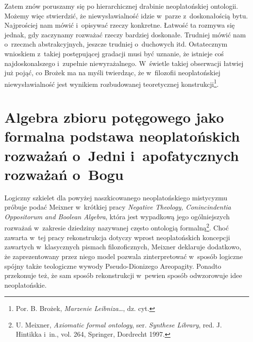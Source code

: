 Zatem znów poruszamy się po hierarchicznej drabinie neoplatońskiej ontologii. Możemy więc stwierdzić, że niewysławialność idzie w~parze z~doskonałością bytu. Najprościej nam mówić i~opisywać rzeczy konkretne. Łatwość ta rozmywa się jednak, gdy zaczynamy rozważać rzeczy bardziej doskonałe. Trudniej mówić nam o~rzeczach abstrakcyjnych, jeszcze trudniej o~duchowych itd. Ostatecznym wnioskiem z~takiej postępującej gradacji musi być uznanie, że istnieje coś najdoskonalszego i~zupełnie niewyrażalnego. W~świetle takiej obserwacji łatwiej już pojąć, co Brożek ma na myśli twierdząc, że w~filozofii neoplatońskiej niewysławialność jest wynikiem rozbudowanej teoretycznej konstrukcji\footnote{Por. B. Brożek, \textit{Marzenie Leibniza}\ldots, dz. cyt.}.

\section{Algebra zbioru potęgowego jako formalna podstawa neoplatońskich rozważań o~Jedni i~apofatycznych rozważań o~Bogu}

Logiczny szkielet dla powyżej naszkicowanego neoplatońskiego mistycyzmu próbuje podać Meixner w~krótkiej pracy \textit{Negative Theology, Conincindentia Oppositorum and Boolean Algebra}, która jest wypadkową jego ogólniejszych rozważań w~zakresie dziedziny nazywanej często ontologią formalną\footnote{U. Meixner, \textit{Axiomatic formal ontology}, ser. \textit{Synthese Library}, red. J. Hintikka i~in., vol. 264, Springer, Dordrecht 1997.}. Choć zawarta w~tej pracy rekonstrukcja dotyczy wprost neoplatońskich koncepcji zawartych w~klasycznych pismach filozoficznych, Mei\-xner deklaruje dodatkowo, że zaprezentowany przez niego model pozwala zinterpretować w~sposób logiczne spójny także teologiczne wywody Pseudo-Dionizego Areopagity. Ponadto przekonuje też, że sam sposób rekonstrukcji w~pewien sposób odwzorowuje idee neoplatońskie.


